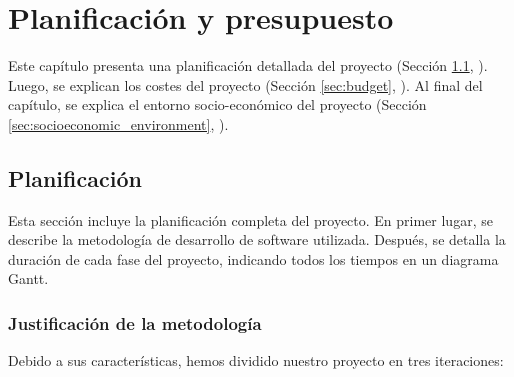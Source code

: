\chead[]{}
\renewcommand{\headrulewidth}{0.5pt}

\lfoot[]{}
\cfoot[]{}
\rfoot[]{}
\renewcommand{\footrulewidth}{0pt}

\chapter{Planificación y presupuesto}
\label{ch:planning_and_budget}

Este capítulo presenta una planificación detallada del proyecto (Sección \ref{sec:planning}, \textit{}). Luego, se explican los costes del proyecto (Sección \ref{sec:budget}, \textit{}). Al final del capítulo, se explica el entorno socio-económico del proyecto ({Sección \ref{sec:socioeconomic_environment}, \textit{}}).

\section{Planificación}
\label{sec:planning}

Esta sección incluye la planificación completa del proyecto. En primer lugar, se describe la metodología de desarrollo de \gls{software} utilizada. Después, se detalla la duración de cada fase del proyecto, indicando todos los tiempos en un diagrama Gantt.

\subsection{Justificación de la metodología}

Debido a sus características, hemos dividido nuestro proyecto en tres iteraciones:

